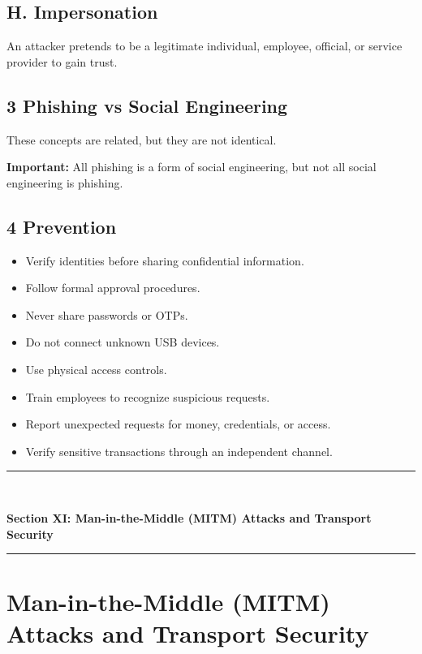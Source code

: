 \subsection{H. Impersonation}

An attacker pretends to be a legitimate individual, employee, official, or service provider to gain trust.

\subsection{3 Phishing vs Social Engineering}

These concepts are related, but they are not identical.


\textbf{Important:} All phishing is a form of social engineering, but not all social engineering is phishing.

\subsection{4 Prevention}

\begin{itemize}
\item Verify identities before sharing confidential information.
\item Follow formal approval procedures.
\item Never share passwords or OTPs.
\item Do not connect unknown USB devices.
\item Use physical access controls.
\item Train employees to recognize suspicious requests.
\item Report unexpected requests for money, credentials, or access.
\item Verify sensitive transactions through an independent channel.
\end{itemize}


\newpage
\begin{center}
\vspace{0.5em}
{\color{primary}\rule{0.45\textwidth}{1.2pt}\\[4pt]}
{\Large\bfseries\color{primary} Section XI: Man-in-the-Middle (MITM) Attacks and Transport Security\\[2pt]}
{\color{primary}\rule{0.45\textwidth}{1.2pt}}
\vspace{0.5em}
\end{center}

\section{Man-in-the-Middle (MITM) Attacks and Transport Security}



